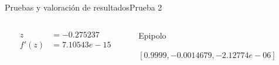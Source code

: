 \documentclass[14pt,spanish]{beamer}
\begin{document}
\begin{frame}{Pruebas y valoración de resultados}{Prueba 2}
\begin{overlayarea}{\textwidth}{8cm}
{\begin{figure}[ht!]
            \end{figure}
            \begin{columns}
              \begin{column}{0.2\textwidth}
                \begin{align*}
                  z &= -0.275237 \\
                  f'(z) &= 7.10543e-15
                \end{align*}

              \end{column}
              \begin{column}{0.8\textwidth}
                Epipolo

                $[0.9999, -0.0014679, -2.12774e-06]$
              \end{column}
            \end{columns}

            }

        \end{overlayarea}

      \end{frame}
\end{document}
